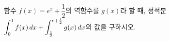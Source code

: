\hspace*{2mm}\begin{minipage}[t]{\dimexpr\linewidth-2mm\relax}\vspace{0pt}
함수 $f(x)=e^x+\dfrac{1}{2}$의 역함수를 $g(x)$라 할 때, 정적분 $\displaystyle\int_{0}^{1}f(x)\mkern3mu dx+\int_{\frac{3}{2}}^{e+\frac{1}{2}}g(x)\mkern3mu dx$의 값을 구하시오.\end{minipage}
